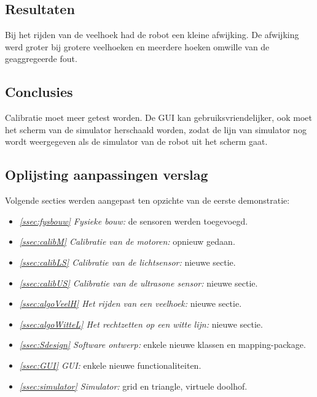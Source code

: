 \documentclass[eind]{penoverslag}
\begin{document}
\subsection{Resultaten} %
\label{Assec:result1}
Bij het rijden van de veelhoek had de robot een kleine afwijking. De afwijking werd groter bij grotere veelhoeken en meerdere hoeken omwille van de geaggregeerde fout.

\subsection{Conclusies} %
\label{Assec:conc1}
Calibratie moet meer getest worden. De GUI kan gebruiksvriendelijker, ook moet het scherm van de simulator herschaald worden, zodat de lijn van simulator nog wordt weergegeven als de simulator van de robot uit het scherm gaat.

\subsection{Oplijsting aanpassingen verslag} %
\label{Assec:aanp1}
Volgende secties werden aangepast ten opzichte van de eerste demonstratie:

\begin{itemize}
\item \textit{\ref{ssec:fysbouw} Fysieke bouw:} de sensoren werden toegevoegd.
\item \textit{\ref{ssec:calibM} Calibratie van de motoren:} opnieuw gedaan.
\item \textit{\ref{ssec:calibLS} Calibratie van de lichtsensor:} nieuwe sectie.
\item \textit{\ref{ssec:calibUS} Calibratie van de ultrasone sensor:} nieuwe sectie.
\item \textit{\ref{ssec:algoVeelH} Het rijden van een veelhoek:} nieuwe sectie.
\item \textit{\ref{ssec:algoWitteL} Het rechtzetten op een witte lijn:} nieuwe sectie.
\item \textit{\ref{ssec:Sdesign} Software ontwerp:} enkele nieuwe klassen en mapping-package.
\item \textit{\ref{ssec:GUI} GUI:} enkele nieuwe functionaliteiten.
\item \textit{\ref{ssec:simulator} Simulator:} grid en triangle, virtuele doolhof.
\end{itemize}


\end{document}
